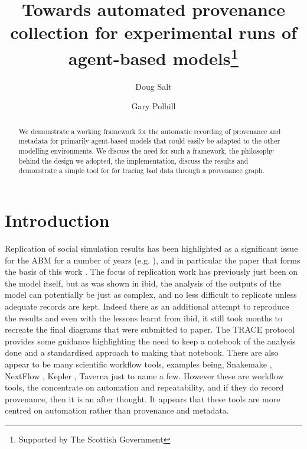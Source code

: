 \documentclass[runningheads]{llncs}
\begin{document}
%
\title{Towards automated provenance collection for experimental runs of agent-based models\thanks{Supported by The Scottish Government}}
%
%
\author{Doug Salt \and
Gary Polhill }
%
%
%
\maketitle              %
%
\begin{abstract}
    We demonstrate a working framework for the automatic recording of
    provenance and metadata for primarily agent-based models that could easily
    be adapted to the other modelling environments. We discuss the need for
    such a framework, the philosophy behind the design we adopted, the
    implementation, discuss the results and demonstrate a simple tool for for
    tracing bad data through a provenance graph.

\end{abstract}
%
%
%
\section{Introduction}

Replication of social simulation results has been highlighted as a significant
issue for the ABM for a number of years (e.g.  \cite{edmonds2003replication}),
and in particular the paper that forms the basis of this work
\cite{polhill2017lessons}.  The focus of replication work has previously just
been on the model itself, but as was shown in ibid, the analysis of the
outputs of the model can potentially be just as complex, and no less difficult
to replicate unless adequate records are kept. Indeed there as an additional
attempt to reproduce the results and even with the lessons learnt from ibid, it
still took months to recreate the final diagrams that were submitted to paper.
The TRACE protocol \cite{schmolke2010ecological,ayllon2021keeping} provides
some guidance highlighting the need to keep a notebook of the analysis done and
a standardised approach to making that notebook. There are also appear to be
many scientific workflow tools, examples being, Snakemake
\cite{koster2012snakemake}, NextFlow \cite{di2017nextflow}, Kepler
\cite{ludascher2006scientific}, Taverna \cite{hull2006taverna} just to name a
few. However these are workflow tools, the concentrate on automation and
repeatability, and if they do record provenance, then it is an after thought.
It appears that these tools are more centred on automation rather than
provenance and metadata.
\end{document}
